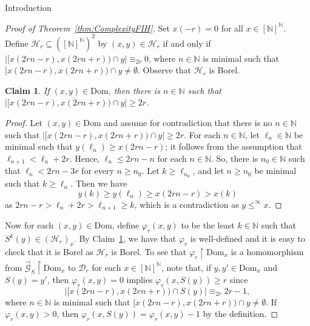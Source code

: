 \documentclass[psamsfonts]{amsart}
\newtheorem{claim}[thm]{Claim}
\theoremstyle{definition}
\newcommand{\N}{\mathbb N}
\newcommand{\Dom}{\text{Dom}}
\theoremstyle{remark}
\numberwithin{equation}{section}
\newcommand{\rest}{\restriction}
\newcommand\mcal{\mathcal}
\begin{document}
\begin{section}{Introduction}
\begin{proof}[Proof of Theorem~\ref{thm:ComplexityFIH}]
Set $x(-r) = 0$ for all $x \in [\N]^{\N}$. Define $\mcal{H}_r \subseteq ([\N]^{\N})^2$ by $(x, y) \in \mcal{H}_r$ if and only if $\vert [x(2rn - r), x(2rn + r)) \cap y \vert \equiv_{2r} 0$, where $n \in \N$ is minimal such that $[x(2rn - r), x(2rn + r)) \cap y \neq \emptyset$.
Observe that $\mcal{H}_r$ is Borel.


    \begin{claim}\label{cl:WellDefined}
        If $(x, y) \in \Dom$, then there is $n \in \N$ such that $\vert [x(2rn - r), x(2rn + r)) \cap y \vert \geq 2r$. 
    \end{claim}
    \begin{proof}
        Let $(x,y)\in \Dom$ and assume for contradiction that there is no $n\in \N$ such that $\vert[x(2rn - r), x(2rn + r)) \cap y \vert\ge 2r$.
        For each $n \in \N$, let $\ell_n\in \N$ be minimal such that $y(\ell_n)\ge x(2rn-r)$; it follows from the assumption that $\ell_{n+1}<\ell_n+2r$.
        Hence, $\ell_n \leq 2rn - n$ for each $n \in \N$. So, there is $n_0\in \N$ such that $\ell_{n}< 2rn-3r$ for every $n\ge n_0$.
        Let $k\ge \ell_{n_0}$, and let $n\ge n_0$ be minimal such that $k\ge \ell_n$.
        Then we have
        $$y(k)\ge y(\ell_n)\ge x(2rn-r)> x(k)$$
        as $2rn-r> \ell_n+2r > \ell_{n+1} \ge k$, which is a contradiction as $y\le^\infty x$.
    \end{proof}

Now for each $(x, y) \in \Dom$, define $\varphi_r(x, y)$ to be the least $k \in \N$ such that $S^k(y) \in (\mcal{H}_r)_x$.
By Claim~\ref{cl:WellDefined}, we have that $\varphi_r$ is well-defined and it is easy to check that it is Borel as $\mathcal{H}_r$ is Borel.
To see that $\varphi_r \rest \Dom_x$ is a homomorphism from $\overrightarrow{\mcal{G}}_S \rest \Dom_x$ to $\mcal{D}_r$ for each $x \in [\N]^{\N}$, note that, if $y, y' \in \Dom_x$ and $S(y) = y'$, then $\varphi_r(x, y) = 0$ implies $\varphi_r(x, S(y)) \geq r$ since
$$\vert [x(2rn - r), x(2rn + r)) \cap S(y) \vert \equiv_{2r} 2r-1,$$
where $n \in \N$ is minimal such that $[x(2rn - r), x(2rn + r)) \cap y \neq \emptyset$.
If $\varphi_r(x, y) > 0$, then $\varphi_r(x, S(y)) = \varphi_r(x, y) - 1$ by the definition.


\end{proof}
\end{section}
\end{document}
